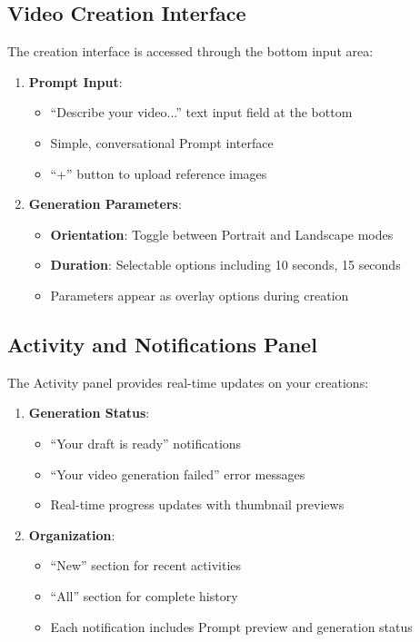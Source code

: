 \subsection{Video Creation Interface}

The creation interface is accessed through the bottom input area:

\begin{enumerate}
\item \textbf{Prompt Input}:
\begin{itemize}
\item ``Describe your video...'' text input field at the bottom
\item Simple, conversational Prompt interface
\item ``+'' button to upload reference images
\end{itemize}

\item \textbf{Generation Parameters}:
\begin{itemize}
\item \textbf{Orientation}: Toggle between Portrait and Landscape modes
\item \textbf{Duration}: Selectable options including 10 seconds, 15 seconds
\item Parameters appear as overlay options during creation
\end{itemize}
\end{enumerate}

\subsection{Activity and Notifications Panel}

The Activity panel provides real-time updates on your creations:

\begin{enumerate}
\item \textbf{Generation Status}:
\begin{itemize}
\item ``Your draft is ready'' notifications
\item ``Your video generation failed'' error messages
\item Real-time progress updates with thumbnail previews
\end{itemize}

\item \textbf{Organization}:
\begin{itemize}
\item ``New'' section for recent activities
\item ``All'' section for complete history
\item Each notification includes Prompt preview and generation status
\end{itemize}
\end{enumerate}

